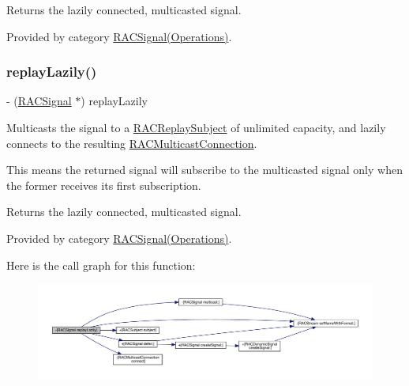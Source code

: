 Returns the lazily connected, multicasted signal. 

Provided by category \mbox{\hyperlink{category_r_a_c_signal_07_operations_08_aa1a3386d321ec82ceff16d98eaf74d33}{R\+A\+C\+Signal(\+Operations)}}.

\mbox{\label{interface_r_a_c_signal_aa1a3386d321ec82ceff16d98eaf74d33}} 
\subsubsection{\texorpdfstring{replay\+Lazily()}{replayLazily()}\hspace{0.1cm}{\footnotesize\ttfamily [3/3]}}
{\footnotesize\ttfamily -\/ (\mbox{\hyperlink{interface_r_a_c_signal}{R\+A\+C\+Signal}} $\ast$) replay\+Lazily \begin{DoxyParamCaption}{ }\end{DoxyParamCaption}}

Multicasts the signal to a \mbox{\hyperlink{interface_r_a_c_replay_subject}{R\+A\+C\+Replay\+Subject}} of unlimited capacity, and lazily connects to the resulting \mbox{\hyperlink{interface_r_a_c_multicast_connection}{R\+A\+C\+Multicast\+Connection}}.

This means the returned signal will subscribe to the multicasted signal only when the former receives its first subscription.

Returns the lazily connected, multicasted signal. 

Provided by category \mbox{\hyperlink{category_r_a_c_signal_07_operations_08_aa1a3386d321ec82ceff16d98eaf74d33}{R\+A\+C\+Signal(\+Operations)}}.

Here is the call graph for this function\+:\nopagebreak
\begin{figure}[H]
\begin{center}
\leavevmode
\includegraphics[width=350pt]{interface_r_a_c_signal_aa1a3386d321ec82ceff16d98eaf74d33_cgraph}
\end{center}
\end{figure}
\mbox{\label{interface_r_a_c_signal_a3601540c46ceb34dbd1c242782022809}} 

